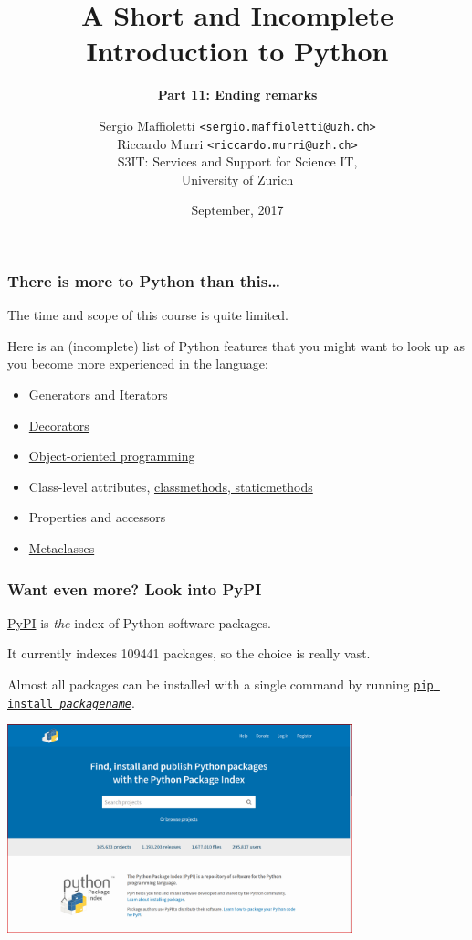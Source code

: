 \documentclass[english,serif,mathserif,xcolor=pdftex,dvipsnames,table]{beamer}
\title[Introduction to Python]{%
  A Short and Incomplete Introduction to Python
}
\subtitle{\bfseries Part 11: Ending remarks}
\author[S.~Maffioletti]{%
  Sergio Maffioletti \texttt{<sergio.maffioletti@uzh.ch>}
  \\
  Riccardo Murri \texttt{<riccardo.murri@uzh.ch>}
  \\
  S3IT: Services and Support for Science IT,
  \\
  University of Zurich
}
\date{September, 2017}
\begin{document}
\maketitle



\begin{frame}
  \frametitle{There is more to Python than this\ldots}

  The time and scope of this course is quite limited.

  \+
  Here is an (incomplete) list of Python features that you might
  want to look up as you become more experienced in the language:
  \begin{itemize}
  \item
    \href{http://docs.python.org/2/tutorial/classes.html\#generators}{Generators}
    and
    \href{http://docs.python.org/2/tutorial/classes.html\#iterators}{Iterators}
  \item
    \href{http://www.artima.com/weblogs/viewpost.jsp?thread=240808}{Decorators}
  \item \href{https://github.com/gc3-uzh-ch/python-course}{Object-oriented programming}
  \item Class-level attributes, \href{http://stackoverflow.com/a/12179752/1808780}{classmethods, staticmethods}
  \item Properties and accessors
  \item \href{http://stackoverflow.com/a/6581949/459543}{Metaclasses}
  \end{itemize}
\end{frame}


\begin{frame}
  \frametitle{Want even more? Look into PyPI}

  \href{http://pypi.python.org}{PyPI} is \emph{the} index of Python software packages.

  \+ It currently indexes 109441 packages, so the choice is really vast.

  \+ Almost all packages can be installed with a single command by
  running \href{https://pypi.python.org/pypi/pip}{\texttt{pip install
    \emph{packagename}}}.

  \+
  \begin{center}
    \includegraphics[width=0.75\textwidth]{fig/pypi_screenshot.png}
  \end{center}
\end{frame}
\end{document}
